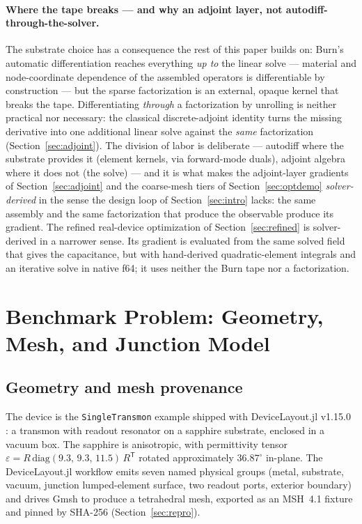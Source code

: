 \documentclass{anvil-paper}
\begin{document}
\paragraph{Where the tape breaks --- and why an adjoint layer, not
autodiff-through-the-solver.}
The substrate choice has a consequence the rest of this paper builds on:
Burn's automatic differentiation reaches everything \emph{up to} the
linear solve --- material and node-coordinate dependence of the assembled
operators is differentiable by construction --- but the sparse
factorization is an external, opaque kernel that breaks the tape.
Differentiating \emph{through} a factorization by unrolling is neither
practical nor necessary: the classical discrete-adjoint identity turns
the missing derivative into one additional linear solve against the
\emph{same} factorization (Section~\ref{sec:adjoint}). The division of
labor is deliberate --- autodiff where the substrate provides it (element
kernels, via forward-mode duals), adjoint algebra where it does not (the
solve) --- and it is what makes the adjoint-layer gradients of
Section~\ref{sec:adjoint} and the coarse-mesh tiers of
Section~\ref{sec:optdemo} \emph{solver-derived} in the sense the design
loop of Section~\ref{sec:intro} lacks: the same assembly and the same
factorization that produce the observable produce its gradient. The
refined real-device optimization of Section~\ref{sec:refined} is
solver-derived in a narrower sense. Its gradient is evaluated from the
same solved field that gives the capacitance, but with hand-derived
quadratic-element integrals and an iterative solve in native f64; it
uses neither the Burn tape nor a factorization.

\section{Benchmark Problem: Geometry, Mesh, and Junction Model}
\label{sec:problem}

\subsection{Geometry and mesh provenance}
\label{sec:geometry}

The device is the \texttt{SingleTransmon} example shipped with
DeviceLayout.jl v1.15.0 \citep{devicelayout}: a transmon with readout
resonator on a sapphire substrate, enclosed in a vacuum box. The sapphire
is anisotropic, with permittivity tensor
$\varepsilon = R\,\mathrm{diag}(9.3,\, 9.3,\, 11.5)\,R^{\mathsf{T}}$
rotated approximately $36.87^\circ$ in-plane. The DeviceLayout.jl
workflow emits seven named physical groups (metal, substrate, vacuum,
junction lumped-element surface, two readout ports, exterior boundary)
and drives Gmsh \citep{gmsh} to produce a tetrahedral mesh, exported as
an MSH~4.1 fixture and pinned by SHA-256 (Section~\ref{sec:repro}).
\end{document}
